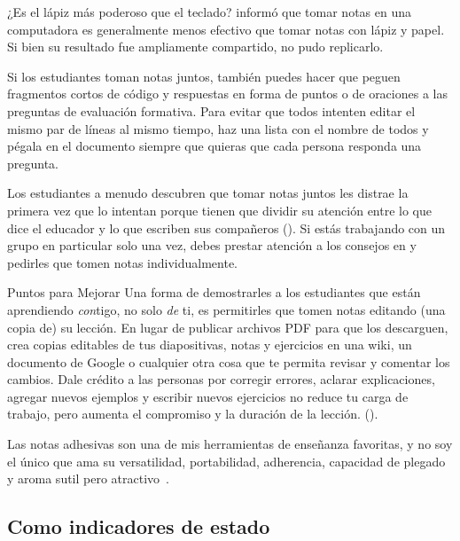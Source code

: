 \begin{aside}{¿Es el lápiz más poderoso que el teclado?}
  \cite{Muel2014} informó que tomar notas en una computadora
  es generalmente menos efectivo que tomar notas con lápiz y papel.
  Si bien su resultado fue ampliamente compartido,
  \cite{More2019} no pudo replicarlo.
\end{aside}

Si los estudiantes toman notas juntos,
también puedes hacer que peguen fragmentos cortos de código
y respuestas en forma de puntos o de oraciones a las preguntas de evaluación formativa.
Para evitar que todos intenten editar el mismo par de líneas al mismo tiempo,
haz una lista con el nombre de todos y pégala en el documento
siempre que quieras que cada persona responda una pregunta.

Los estudiantes a menudo descubren que tomar notas juntos les distrae
la primera vez que lo intentan porque tienen que dividir su atención entre
lo que dice el educador
y lo que escriben sus compañeros ().
Si estás trabajando con un grupo en particular solo una vez,
debes prestar atención a los consejos en 
y pedirles que tomen notas individualmente.

\begin{aside}{Puntos para Mejorar}
  Una forma de demostrarles a los estudiantes que están aprendiendo \emph{con}tigo,
  no solo \emph{de} ti,
  es permitirles que tomen notas editando (una copia de) su lección.
  En lugar de publicar archivos PDF para que los descarguen,
  crea copias editables de tus diapositivas, notas y ejercicios
  en una wiki,
  un documento de Google
  o cualquier otra cosa que te permita revisar y comentar los cambios.
  Dale crédito a las personas por corregir errores,
  aclarar explicaciones,
  agregar nuevos ejemplos
  y escribir nuevos ejercicios no reduce tu carga de trabajo,
  pero aumenta el compromiso y la duración de la lección.
  ().
\end{aside}


Las notas adhesivas son una de mis herramientas de enseñanza favoritas,
y no soy el único que ama su versatilidad,
portabilidad, adherencia, capacidad de plegado
y aroma sutil pero atractivo~\cite{Ward2015}.

\subsection*{Como indicadores de estado}

